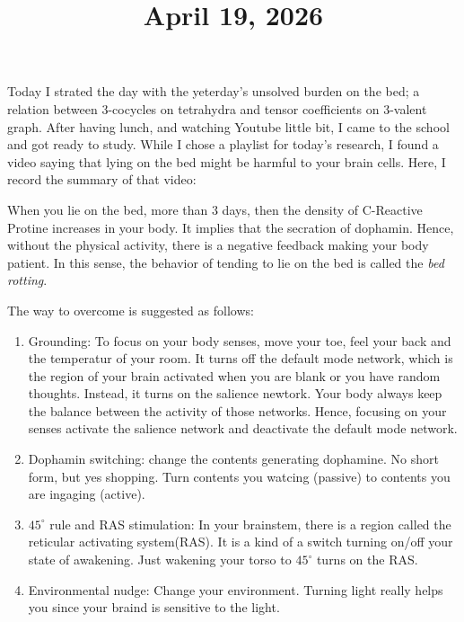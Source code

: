 \documentclass[11pt]{amsart}
\title{April 19, 2026}
\begin{document}
\maketitle

Today I strated the day with the yeterday's unsolved burden on the bed; a relation between 3-cocycles on tetrahydra and tensor coefficients on 3-valent graph.
After having lunch, and watching Youtube little bit, I came to the school and got ready to study.
While I chose a playlist for today's research, I found a video saying that lying on the bed might be harmful to your brain cells.
Here, I record the summary of that video:

When you lie on the bed, more than 3 days, then the density of C-Reactive Protine increases in your body.
It implies that the secration of dophamin.
Hence, without the physical activity, there is a negative feedback making your body patient.
In this sense, the behavior of tending to lie on the bed is called the \emph{bed rotting}.

The way to overcome is suggested as follows:
\begin{enumerate}
    \item Grounding: To focus on your body senses, move your toe, feel your back and the temperatur of your room.
    It turns off the default mode network, which is the region of your brain activated when you are blank or you have random thoughts.
    Instead, it turns on the salience newtork.
    Your body always keep the balance between the activity of those networks.
    Hence, focusing on your senses activate the salience network and deactivate the default mode network.

    \item Dophamin switching: change the contents generating dophamine.
    No short form, but yes shopping.
    Turn contents you watcing (passive) to contents you are ingaging (active).

    \item $45^\circ$ rule and RAS stimulation: In your brainstem, there is a region called the reticular activating system(RAS).
    It is a kind of a switch turning on/off your state of awakening.
    Just wakening your torso to $45^\circ$ turns on the RAS.
    
    \item Environmental nudge: Change your environment.
    Turning light really helps you since your braind is sensitive to the light.
\end{enumerate}
\end{document}
